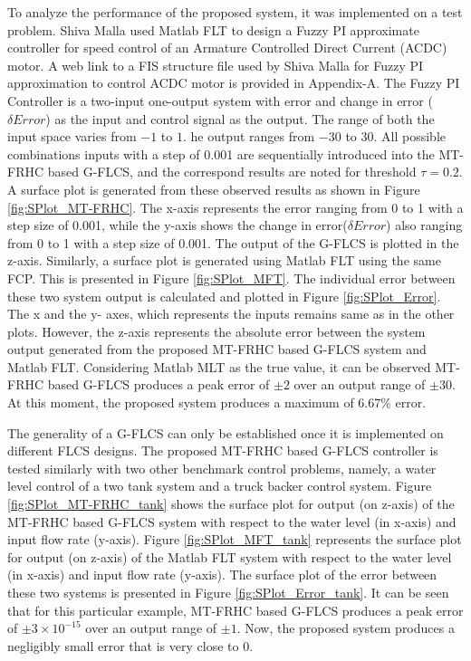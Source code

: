 To analyze the performance of the proposed system, it was implemented on a test problem. Shiva Malla \cite{malla2012} used Matlab FLT to design a Fuzzy PI approximate controller for speed control of an Armature Controlled Direct Current (ACDC) motor. A web link to a FIS structure file used by Shiva Malla \cite{malla2012} for Fuzzy PI approximation to control ACDC motor is provided in Appendix-A. The Fuzzy PI Controller is a two-input one-output system with error and change in error ($\delta Error$) as the input and control signal as the output. The range of both the input space varies from $-1 $ to $ 1 $. he output ranges from $ -30 $ to $ 30 $. All possible combinations inputs with a step of 0.001 are sequentially introduced into the MT-FRHC based G-FLCS, and the correspond results are noted for threshold $ \tau = 0.2 $. A surface plot is generated from these observed results as shown in Figure \ref{fig:SPlot_MT-FRHC}. The x-axis represents the error ranging from 0 to 1 with a step size of 0.001, while the y-axis shows the change in error($\delta Error$) also ranging from 0 to 1 with a step size of 0.001. The output of the G-FLCS is plotted in the z-axis. Similarly, a surface plot is generated using Matlab FLT using the same FCP. This is presented in Figure \ref{fig:SPlot_MFT}. The individual error between these two system output is calculated and plotted in Figure \ref{fig:SPlot_Error}. The x and the y- axes, which represents the inputs remains same as in the other plots. However, the z-axis represents the absolute error between the system output generated from the proposed MT-FRHC based G-FLCS system and Matlab FLT. Considering Matlab MLT as the true value, it can be observed  MT-FRHC based G-FLCS produces a peak error of $ \pm 2 $ over an output range of $ \pm 30 $. At this moment, the proposed system produces a maximum of 6.67\% error.

The generality of a G\hyp{}FLCS can only be established once it is implemented on different FLCS designs. The proposed MT-FRHC based G-FLCS controller is tested similarly with two other benchmark control problems, namely, a water level control of a two tank system \cite{twotank2012} and a truck backer control system\cite{Passino2010}. Figure \ref{fig:SPlot_MT-FRHC_tank} shows the surface plot for output (on z-axis) of the MT-FRHC based G-FLCS system with respect to the water level (in x-axis) and input flow rate (y-axis). Figure \ref{fig:SPlot_MFT_tank} represents the surface plot for output (on z-axis) of the Matlab FLT system with respect to the water level (in x-axis) and input flow rate (y-axis). The surface plot of the error between these two systems is presented in Figure \ref{fig:SPlot_Error_tank}. It can be seen that for this particular example, MT-FRHC based G-FLCS produces a peak error of $ \pm 3\times10^{-15} $ over an output range of $ \pm 1 $. Now, the proposed system produces a negligibly small error that is very close to 0.

